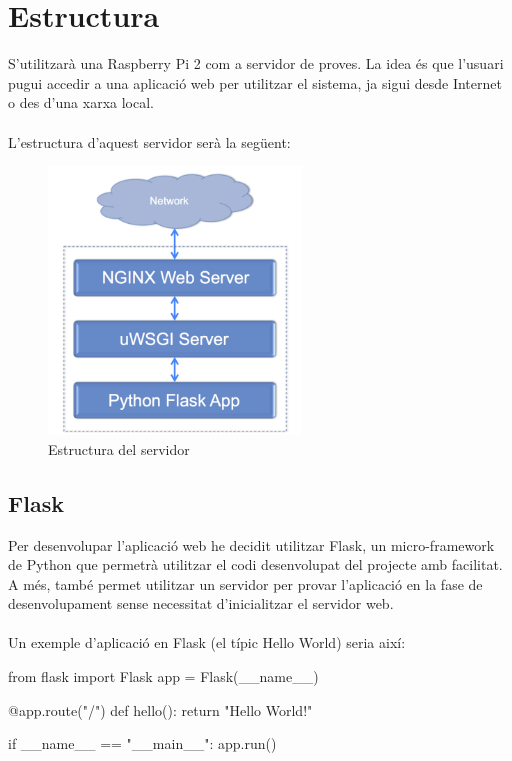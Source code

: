 \section{Estructura}
	S'utilitzarà una Raspberry Pi 2 com a servidor de proves. La idea és que l'usuari pugui accedir a una aplicació web per utilitzar el sistema, ja sigui desde Internet o des d'una xarxa local.\\\\
	L'estructura d'aquest servidor serà la següent:\\
	\begin{figure}[H]
			\centering
			\includegraphics[width=0.6\textwidth]{images/server}
			\caption{Estructura del servidor}
	\end{figure}

	\subsection{Flask}
		Per desenvolupar l'aplicació web he decidit utilitzar Flask, un micro-framework de Python que permetrà utilitzar el codi desenvolupat del projecte amb facilitat.
		A més, també permet utilitzar un servidor per provar l'aplicació en la fase de desenvolupament sense necessitat d'inicialitzar el servidor web.\\\\
		Un exemple d'aplicació en Flask (el típic Hello World) seria així:\\
		\begin{python}
from flask import Flask
app = Flask(__name__)

@app.route("/")
def hello():
	return "Hello World!"

if __name__ == "__main__":
	app.run()
		\end{python}
